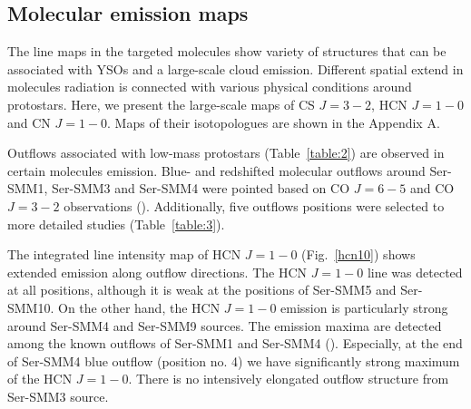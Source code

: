 \documentclass{aa}
\begin{document}
\subsection{Molecular emission maps}

The line maps in the targeted molecules show variety of structures that can be associated with YSOs and a large-scale cloud emission. Different spatial extend in molecules radiation is connected with various physical conditions around protostars. Here, we present the large-scale maps of CS $J=3-2$, HCN $J=1-0$ and CN $J=1-0$. Maps of their isotopologues are shown in the Appendix A. 

Outflows associated with low-mass protostars (Table~\ref{table:2}) are observed in certain molecules emission. Blue- and redshifted molecular outflows around Ser-SMM1, Ser-SMM3 and Ser-SMM4 were pointed based on CO $J=6-5$ and CO $J=3-2$ observations (\cite{Yil15}). Additionally, five outflows positions were selected to more detailed studies (Table~\ref{table:3}).  

The integrated line intensity map of HCN $J=1-0$ (Fig.~\ref{hcn10}) shows extended emission along outflow directions. The HCN $J=1-0$ line was detected at all positions, although it is weak at the positions of Ser-SMM5 and Ser-SMM10. On the other hand, the HCN $J=1-0$ emission is particularly strong around Ser-SMM4 and Ser-SMM9 sources. The emission maxima are detected among the known outflows of Ser-SMM1 and Ser-SMM4 (\cite{Yil15}). Especially, at the end of Ser-SMM4 blue outflow (position no. 4) we have significantly strong maximum of the HCN $J=1-0$. There is no intensively elongated outflow structure from Ser-SMM3 source.
\end{document}
